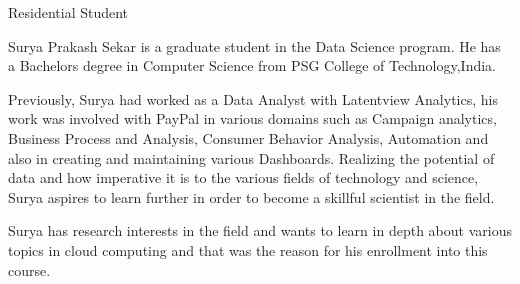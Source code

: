 Residential Student

Surya Prakash Sekar is a graduate student in the Data Science program. He has a
Bachelors degree in Computer Science from PSG College of Technology,India.

Previously, Surya had worked as a Data Analyst with Latentview Analytics,
his work was involved with PayPal in various domains such as Campaign analytics,
Business Process and Analysis, Consumer Behavior Analysis, Automation and also 
in creating and maintaining various Dashboards. Realizing the potential of data 
and how imperative it is to the various fields of technology and science, Surya 
aspires to learn further in order to become a skillful scientist in the field.

Surya has research interests in the field and wants to learn in depth about
various topics in cloud computing and that was the reason for his enrollment 
into this course.